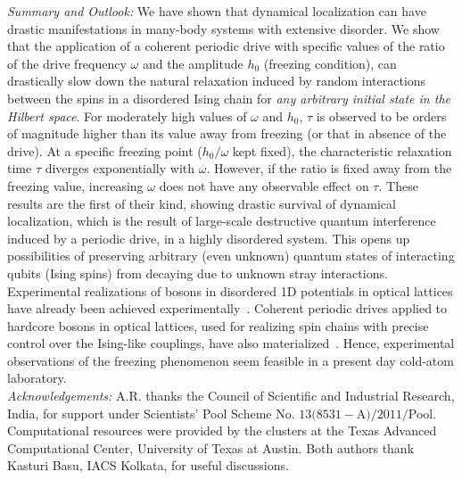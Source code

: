\documentclass[reprint,preprintnumbers,showpacs,amsmath,twocolumn,showkeys,aps,prl]{revtex4-1}
\begin{document}
\noindent
{\it Summary and Outlook:}
We have shown that dynamical localization can have drastic manifestations in many-body systems with
extensive disorder. We show that the application of a coherent periodic drive with specific values of the ratio 
of the drive frequency $\omega$ and the amplitude $h_{0}$ (freezing condition), can drastically slow 
down the natural relaxation induced by random interactions between the spins in a disordered Ising chain
for {\it any arbitrary initial state in the Hilbert space}. 
For moderately high values of $\omega$ and $h_{0}$, $\tau$ is observed to be orders of magnitude higher 
than its value away from freezing (or that in absence of the drive). At a specific freezing point 
($h_{0}/\omega$ kept fixed), the characteristic relaxation time $\tau$ diverges exponentially with 
$\omega$. However, if the ratio is fixed away from the freezing value, increasing $\omega$
does not have any observable effect on $\tau.$ These results are the first of their kind, showing drastic survival of 
dynamical localization, which is the result of large-scale destructive quantum interference induced by a 
periodic drive, in a highly disordered system. This opens up possibilities of preserving arbitrary (even unknown) 
quantum states of interacting qubits (Ising spins) from decaying due to unknown stray interactions.   
Experimental realizations of bosons in disordered 1D potentials in optical lattices have already been achieved 
experimentally~\cite{Disordered-Bosons,Bloch-Nat-Phys}. Coherent periodic drives applied to hardcore bosons
in optical lattices, used for realizing spin chains with precise control over the Ising-like
couplings, have also materialized~\cite{Bloch-Periodic}.
Hence, experimental observations of the freezing phenomenon seem feasible 
in a present day cold-atom laboratory.       \\
\noindent
{\it Acknowledgements:}
A.R. thanks the Council of Scientific and Industrial Research, India,  for support under Scientists' Pool Scheme No. $13(8531-$A$)/2011/$Pool. Computational resources were provided by the clusters at the Texas Advanced Computational Center, University of Texas at Austin. Both authors thank Kasturi Basu, IACS Kolkata, for useful discussions.


 
 
\end{document}
